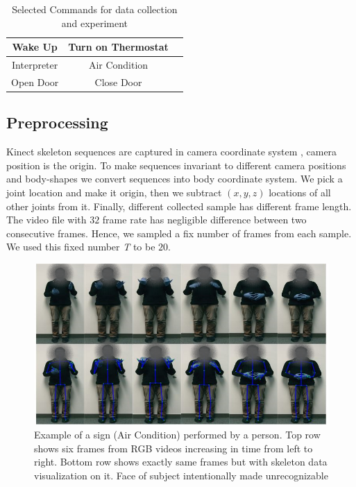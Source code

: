 \documentclass[10pt,twocolumn,letterpaper]{article}
\begin{document}
\begin{table}[h]
	\begin{center}
		\begin{tabular}{|c|c|c}
			\hline
			Wake Up & Turn on Thermostat\\
			\hline
			Interpreter & Air Condition\\
			\hline
			Open Door & Close Door\\
			\hline
		\end{tabular}
	\end{center}
	\caption{Selected Commands for data collection and experiment}
	\label{table:asl_signs}
\end{table}

\subsection{Preprocessing}
Kinect skeleton sequences are captured in camera coordinate system \ie, camera position is the origin. To make sequences invariant to different camera positions and body-shapes we convert sequences into body coordinate system. We pick a joint location and make it origin, then we subtract $(x, y, z)$ locations of all other joints from it. Finally, different collected sample has different frame length. The video file with $32$ frame rate has negligible difference between two consecutive frames. Hence, we sampled a fix number of frames from each sample. We used this fixed number \textit{T} to be $20$. 

\begin{figure}
	\begin{center}
		\includegraphics[width=.8\linewidth]{ac_person1_faceoff}
	\end{center}
	\caption{Example of a sign (Air Condition) performed by a person. Top row shows six frames from RGB videos increasing in time from left to right. Bottom row shows exactly same frames but with skeleton data visualization on it. Face of subject intentionally made unrecognizable}
	\label{fig:ac_person1}
\end{figure}
\end{document}
